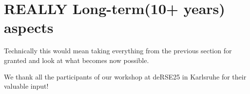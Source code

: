 \documentclass{eceasst}
\begin{document}
\section{REALLY Long-term(10+ years) aspects}
Technically this would mean taking everything from the previous section for granted and look
at what becomes now possible.

\begin{acknowledge}
We thank all the participants of our workshop at deRSE25 in Karlsruhe for their valuable input!
\end{acknowledge}



\end{document}
